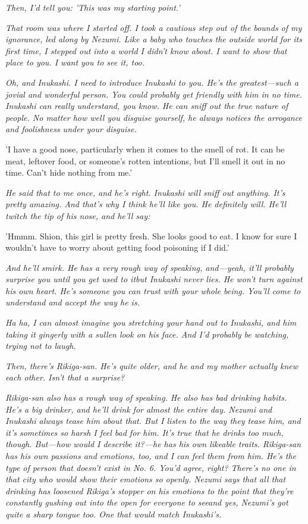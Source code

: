 \emph{Then, I'd tell you: 'This was my starting point.'}

\emph{That room was where I started off. I took a cautious step out of the
bounds of my ignorance, led along by Nezumi. Like a baby who touches the
outside world for its first time, I stepped out into a world I didn't
know about. I want to show that place to you. I want you to see it, too.}

\emph{Oh, and Inukashi. I need to introduce Inukashi to you. He's the
greatest---such a jovial and wonderful person. You could probably get
friendly with him in no time. Inukashi can really understand, you know.
He can sniff out the true nature of people. No matter how well you
disguise yourself, he always notices the arrogance and foolishness under
your disguise.}

'I have a good nose, particularly when it comes to the smell of rot. It
can be meat, leftover food, or someone's rotten intentions, but I'll
smell it out in no time. Can't hide nothing from me.'

\emph{He said that to me once, and he's right. Inukashi will sniff out
anything. It's pretty amazing. And that's why I think he'll like you. He
definitely will. He'll twitch the tip of his nose, and he'll say:}

'Hmmm. Shion, this girl is pretty fresh. She looks good to eat. I know
for sure I wouldn't have to worry about getting food poisoning if I
did.'

\emph{And he'll smirk. He has a very rough way of speaking, and---yeah, it'll
probably surprise you until you get used to it\el but Inukashi never
lies. He won't turn against his own heart. He's someone you can trust
with your whole being. You'll come to understand and accept the way he
is.}

\emph{Ha ha, I can almost imagine you stretching your hand out to Inukashi,
and him taking it gingerly with a sullen look on his face. And I'd
probably be watching, trying not to laugh.}

\emph{Then, there's Rikiga-san. He's quite older, and he and my mother
actually knew each other. Isn't that a surprise?}

\emph{Rikiga-san also has a rough way of speaking. He also has bad drinking
habits. He's a big drinker, and he'll drink for almost the entire day.
Nezumi and Inukashi always tease him about that. But I listen to the way
they tease him, and it's sometimes so harsh I feel bad for him. It's
true that he drinks too much, though. But---how would I describe it?---he
has his own likeable traits. Rikiga-san has his own passions and
emotions, too, and I can feel them from him. He's the type of person
that doesn't exist in No. 6. You'd agree, right? There's no one in that
city who would show their emotions so openly. Nezumi says that all that
drinking has loosened Rikiga's stopper on his emotions to the point that
they're constantly gushing out into the open for everyone to see\el and
yes, Nezumi's got quite a sharp tongue too. One that would match
Inukashi's.}

